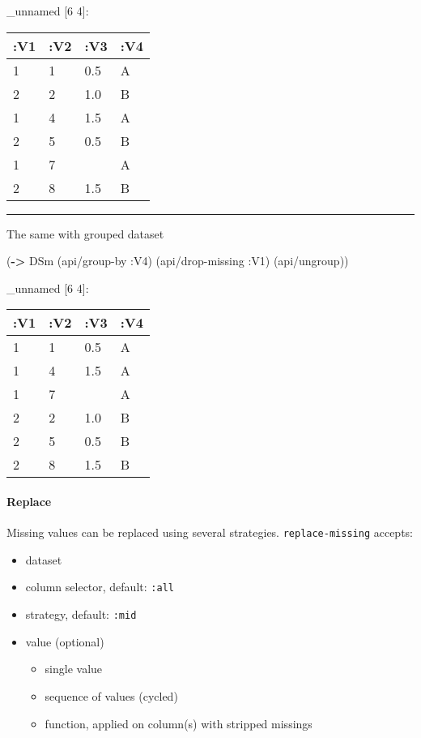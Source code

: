\documentclass[]{article}
\newenvironment{Shaded}{\begin{snugshade}}{\end{snugshade}}
\newcommand{\AttributeTok}[1]{\textcolor[rgb]{0.77,0.63,0.00}{#1}}
\newcommand{\KeywordTok}[1]{\textcolor[rgb]{0.13,0.29,0.53}{\textbf{#1}}}
\newcommand{\NormalTok}[1]{#1}
\providecommand{\tightlist}{%
  \setlength{\itemsep}{0pt}\setlength{\parskip}{0pt}}
\let\oldparagraph\paragraph
\renewcommand{\paragraph}[1]{\oldparagraph{#1}\mbox{}}
\begin{document}
\_unnamed {[}6 4{]}:

\begin{longtable}[]{@{}llll@{}}
\toprule
:V1 & :V2 & :V3 & :V4\tabularnewline
\midrule
\endhead
1 & 1 & 0.5 & A\tabularnewline
2 & 2 & 1.0 & B\tabularnewline
1 & 4 & 1.5 & A\tabularnewline
2 & 5 & 0.5 & B\tabularnewline
1 & 7 & & A\tabularnewline
2 & 8 & 1.5 & B\tabularnewline
\bottomrule
\end{longtable}

\begin{center}\rule{0.5\linewidth}{0.5pt}\end{center}

The same with grouped dataset

\begin{Shaded}
\begin{Highlighting}[]
\NormalTok{(}\KeywordTok{->}\NormalTok{ DSm}
\NormalTok{    (api/group-by }\AttributeTok{:V4}\NormalTok{)}
\NormalTok{    (api/drop-missing }\AttributeTok{:V1}\NormalTok{)}
\NormalTok{    (api/ungroup))}
\end{Highlighting}
\end{Shaded}

\_unnamed {[}6 4{]}:

\begin{longtable}[]{@{}llll@{}}
\toprule
:V1 & :V2 & :V3 & :V4\tabularnewline
\midrule
\endhead
1 & 1 & 0.5 & A\tabularnewline
1 & 4 & 1.5 & A\tabularnewline
1 & 7 & & A\tabularnewline
2 & 2 & 1.0 & B\tabularnewline
2 & 5 & 0.5 & B\tabularnewline
2 & 8 & 1.5 & B\tabularnewline
\bottomrule
\end{longtable}

\hypertarget{replace}{%
\paragraph{Replace}\label{replace}}

Missing values can be replaced using several strategies.
\texttt{replace-missing} accepts:

\begin{itemize}
\tightlist
\item
  dataset
\item
  column selector, default: \texttt{:all}
\item
  strategy, default: \texttt{:mid}
\item
  value (optional)

  \begin{itemize}
  \tightlist
  \item
    single value
  \item
    sequence of values (cycled)
  \item
    function, applied on column(s) with stripped missings
  \end{itemize}
\end{itemize}
\end{document}
